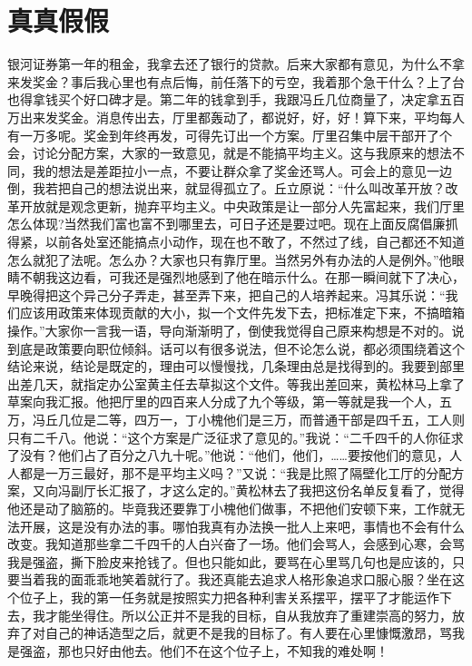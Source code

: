 \documentclass[12pt,oneside]{book}
\begin{document}
\chapter{真真假假}
银河证券第一年的租金，我拿去还了银行的贷款。后来大家都有意见，为什么不拿来发奖金？事后我心里也有点后悔，前任落下的亏空，我着那个急干什么？上了台也得拿钱买个好口碑才是。第二年的钱拿到手，我跟冯丘几位商量了，决定拿五百万出来发奖金。消息传出去，厅里都轰动了，都说好，好，好！算下来，平均每人有一万多呢。奖金到年终再发，可得先订出一个方案。厅里召集中层干部开了个会，讨论分配方案，大家的一致意见，就是不能搞平均主义。这与我原来的想法不同，我的想法是差距拉小一点，不要让群众拿了奖金还骂人。可会上的意见一边倒，我若把自己的想法说出来，就显得孤立了。丘立原说：``什么叫改革开放？改革开放就是观念更新，抛弃平均主义。中央政策是让一部分人先富起来，我们厅里怎么体现?当然我们富也富不到哪里去，可日子还是要过吧。现在上面反腐倡廉抓得紧，以前各处室还能搞点小动作，现在也不敢了，不然过了线，自己都还不知道怎么就犯了法呢。怎么办？大家也只有靠厅里。当然另外有办法的人是例外。''他眼睛不朝我这边看，可我还是强烈地感到了他在暗示什么。在那一瞬间就下了决心，早晚得把这个异己分子弄走，甚至弄下来，把自己的人培养起来。冯其乐说：``我们应该用政策来体现贡献的大小，拟一个文件先发下去，把标准定下来，不搞暗箱操作。''大家你一言我一语，导向渐渐明了，倒使我觉得自己原来构想是不对的。说到底是政策要向职位倾斜。话可以有很多说法，但不论怎么说，都必须围绕着这个结论来说，结论是既定的，理由可以慢慢找，几条理由总是找得到的。我要到部里出差几天，就指定办公室黄主任去草拟这个文件。等我出差回来，黄松林马上拿了草案向我汇报。他把厅里的四百来人分成了九个等级，第一等就是我一个人，五万，冯丘几位是二等，四万一，丁小槐他们是三万，而普通干部是四千五，工人则只有二千八。他说：``这个方案是广泛征求了意见的。''我说：``二千四千的人你征求了没有？他们占了百分之八九十呢。''他说：``他们，他们，\ldots\ldots 要按他们的意见，人人都是一万三最好，那不是平均主义吗？''又说：``我是比照了隔壁化工厅的分配方案，又向冯副厅长汇报了，才这么定的。''黄松林去了我把这份名单反复看了，觉得他还是动了脑筋的。毕竟我还要靠丁小槐他们做事，不把他们安顿下来，工作就无法开展，这是没有办法的事。哪怕我真有办法换一批人上来吧，事情也不会有什么改变。我知道那些拿二千四千的人白兴奋了一场。他们会骂人，会感到心寒，会骂我是强盗，撕下脸皮来抢钱了。但也只能如此，要骂在心里骂几句也是应该的，只要当着我的面乖乖地笑着就行了。我还真能去追求人格形象追求口服心服？坐在这个位子上，我的第一任务就是按照实力把各种利害关系摆平，摆平了才能运作下去，我才能坐得住。所以公正并不是我的目标，自从我放弃了重建崇高的努力，放弃了对自己的神话造型之后，就更不是我的目标了。有人要在心里慷慨激昂，骂我是强盗，那也只好由他去。他们不在这个位子上，不知我的难处啊！
\end{document}
